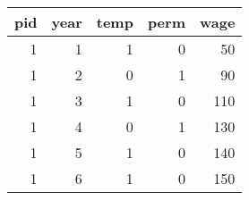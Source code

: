 \begin{tabular}{rrrrr}
  \hline
pid & year & temp & perm & wage \\ 
  \hline
1 & 1 & 1 & 0 & 50 \\ 
  1 & 2 & 0 & 1 & 90 \\ 
  1 & 3 & 1 & 0 & 110 \\ 
  1 & 4 & 0 & 1 & 130 \\ 
  1 & 5 & 1 & 0 & 140 \\ 
  1 & 6 & 1 & 0 & 150 \\ 
   \hline
\end{tabular}
